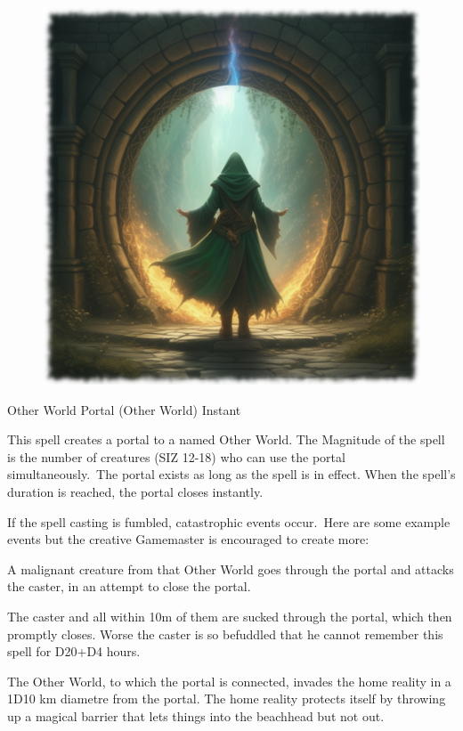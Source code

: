 \begin{figure}[h]
\begin{center}
  \includegraphics[scale=0.23]{img/ai-images/other-world-portal.png}
\end{center}
\end{figure}

\begin{rpg-spell}
{Other World Portal (Other World)}
{Instant}

This spell creates a portal to a named Other World. The Magnitude of the spell is the number of creatures (SIZ 12-18) who can use the portal simultaneously. The portal exists as long as the spell is in effect. When the spell’s duration is reached, the portal closes instantly. 

If the spell casting is fumbled, catastrophic events occur. Here are some example events but the creative Gamemaster is encouraged to create more:
\begin{rpg-list}
\item A malignant creature from that Other World goes through the portal and attacks the caster, in an attempt to close the portal. 
\item The caster and all within 10m of them are sucked through the portal, which then promptly closes. Worse the caster is so befuddled that he cannot remember this spell for D20+D4 hours.
\item The Other World, to which the portal is connected, invades the home reality in a 1D10 km diametre from the portal. The home reality protects itself by throwing up a magical barrier that lets things into the beachhead but not out. 
\end{rpg-list}
\end{rpg-spell}


